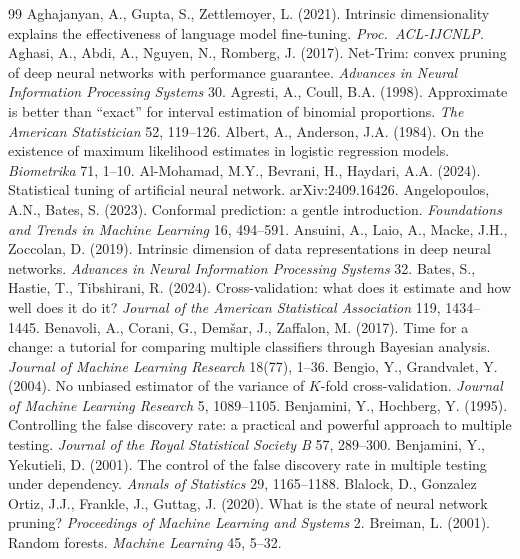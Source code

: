 \documentclass[11pt,a4paper]{article}
\theoremstyle{remark}\newtheorem{remark}{Remark}
\begin{document}
\begin{thebibliography}{99}\small
{} Aghajanyan, A., Gupta, S., Zettlemoyer, L. (2021). Intrinsic dimensionality explains the effectiveness of language model fine-tuning. \emph{Proc.\ ACL-IJCNLP}.
 Aghasi, A., Abdi, A., Nguyen, N., Romberg, J. (2017). Net-Trim: convex pruning of deep neural networks with performance guarantee. \emph{Advances in Neural Information Processing Systems} 30.
 Agresti, A., Coull, B.A. (1998). Approximate is better than ``exact'' for interval estimation of binomial proportions. \emph{The American Statistician} 52, 119--126.
 Albert, A., Anderson, J.A. (1984). On the existence of maximum likelihood estimates in logistic regression models. \emph{Biometrika} 71, 1--10.
 Al-Mohamad, M.Y., Bevrani, H., Haydari, A.A. (2024). Statistical tuning of artificial neural network. arXiv:2409.16426.
 Angelopoulos, A.N., Bates, S. (2023). Conformal prediction: a gentle introduction. \emph{Foundations and Trends in Machine Learning} 16, 494--591.
 Ansuini, A., Laio, A., Macke, J.H., Zoccolan, D. (2019). Intrinsic dimension of data representations in deep neural networks. \emph{Advances in Neural Information Processing Systems} 32.
 Bates, S., Hastie, T., Tibshirani, R. (2024). Cross-validation: what does it estimate and how well does it do it? \emph{Journal of the American Statistical Association} 119, 1434--1445.
 Benavoli, A., Corani, G., Dem\v{s}ar, J., Zaffalon, M. (2017). Time for a change: a tutorial for comparing multiple classifiers through Bayesian analysis. \emph{Journal of Machine Learning Research} 18(77), 1--36.
 Bengio, Y., Grandvalet, Y. (2004). No unbiased estimator of the variance of $K$-fold cross-validation. \emph{Journal of Machine Learning Research} 5, 1089--1105.
 Benjamini, Y., Hochberg, Y. (1995). Controlling the false discovery rate: a practical and powerful approach to multiple testing. \emph{Journal of the Royal Statistical Society B} 57, 289--300.
 Benjamini, Y., Yekutieli, D. (2001). The control of the false discovery rate in multiple testing under dependency. \emph{Annals of Statistics} 29, 1165--1188.
 Blalock, D., Gonzalez Ortiz, J.J., Frankle, J., Guttag, J. (2020). What is the state of neural network pruning? \emph{Proceedings of Machine Learning and Systems} 2.
 Breiman, L. (2001). Random forests. \emph{Machine Learning} 45, 5--32.

\end{thebibliography}
\end{document}
